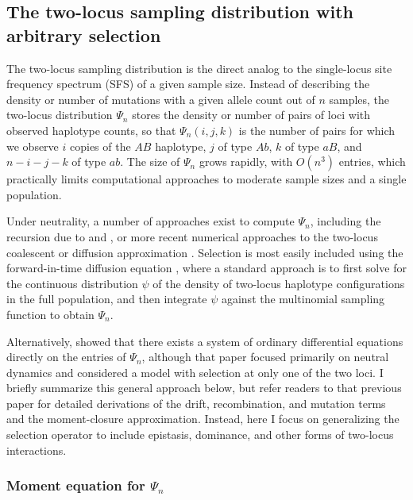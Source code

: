 \documentclass[]{article}
\begin{document}
\subsection{The two-locus sampling distribution with arbitrary selection}
\label{the-two-locus-sampling-distribution-with-arbitrary-selection}

The two-locus sampling distribution is the direct analog to the single-locus
site frequency spectrum (SFS) of a given sample size. Instead of describing the
density or number of mutations with a given allele count out of \(n\) samples,
the two-locus distribution \(\Psi_n\) stores the density or number of pairs of
loci with observed haplotype counts, so that \(\Psi_n(i, j, k)\) is the number of
pairs for which we observe \(i\) copies of the \(AB\) haplotype, \(j\) of type \(Ab\),
\(k\) of type \(aB\), and \(n-i-j-k\) of type \(ab\). The size of \(\Psi_n\) grows
rapidly, with \(O(n^3)\) entries, which practically limits computational
approaches to moderate sample sizes and a single population.

Under neutrality, a number of approaches exist to compute \(\Psi_n\), including
the recursion due to \citet{Golding1984-pu} and \citet{Ethier1990-tb}, or more recent
numerical approaches to the two-locus coalescent \citep{Kamm2016-ag} or diffusion
approximation \citep{Ragsdale2017-gg}. Selection is most easily included using the
forward-in-time diffusion equation \citep{Kimura1955-qe, Hill1966-gv}, where a
standard approach is to first solve for the continuous distribution \(\psi\) of
the density of two-locus haplotype configurations in the full population, and
then integrate \(\psi\) against the multinomial sampling function to obtain
\(\Psi_n\).

Alternatively, \citet{Ragsdale2019-nt} showed that there exists a system of ordinary
differential equations directly on the entries of \(\Psi_n\), although that paper
focused primarily on neutral dynamics and considered a model with selection at
only one of the two loci. I briefly summarize this general approach below, but
refer readers to that previous paper for detailed derivations of the drift,
recombination, and mutation terms and the moment-closure approximation.
Instead, here I focus on generalizing the selection operator to include
epistasis, dominance, and other forms of two-locus interactions.

\subsubsection{Moment equation for \(\Psi_n\)}\label{moment-equation-for-psi_n}
\end{document}
